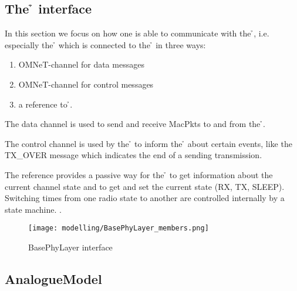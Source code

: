 \subsection{The \h{\bp} interface}

In this section we focus on how one is able to communicate with the 
\h{\bp}, i.e. especially the \h{\bm} which is connected to the \h{\bp}
in three ways:

\begin{enumerate}
 \item OMNeT-channel for data messages
 \item OMNeT-channel for control messages
 \item a reference to \h{\bp}.
\end{enumerate} 

The data channel is used to send and receive MacPkts to and from the \h{\bp}.

The control channel is used by the \h{\bp} to inform the \h{\bm} about
certain events, like the TX\_OVER message 
which indicates the end of a sending transmission.

The reference provides a passive way for the  \h{\bm} to  get information about the current channel state and to get and set the current state (RX, TX, SLEEP).
Switching times from one radio state to another are controlled internally by a state machine. .


\begin{figure}[H]
 \centering
 \texttt{[image: modelling/BasePhyLayer\_members.png]}
 \caption{BasePhyLayer interface}
 \label{fig: BasePhyLayer interface}
\end{figure}



\subsection{AnalogueModel}




